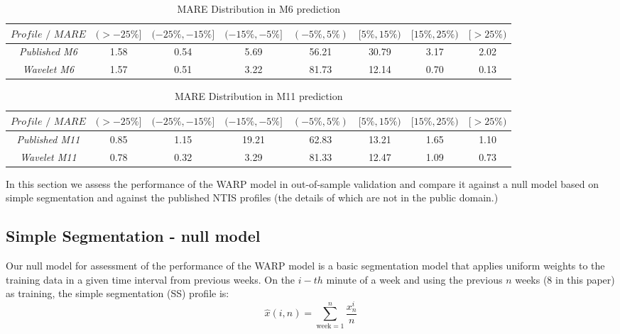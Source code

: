 \documentclass[a4paper, 10pt, conference]{ieeeconf}      %
\begin{document}
\begin{table}[bp]
	\caption{MARE Distribution in M6 prediction}
	\centering
	\begin{center}
	\begin{tabular}{SSSSSSSS} \toprule
    {$\textit{Profile / MARE}$} & {$(>-25\%]$} & {$(-25\%,-15\%] $} & {$(-15\%,-5\%]$} & {$(-5\%,5\%)$} & {$[5\%,15\%)$} & {$[15\%,25\%)$} & {$[>25\%)$} \\ \midrule
    \textit{Published M6}  & 1.58 & 0.54 & 5.69 & 56.21 & 30.79 & 3.17 & 2.02 \\
    \textit{Wavelet M6}  & 1.57  & 0.51 & 3.22  & 81.73 & 12.14 & 0.70  & 0.13 \\ \bottomrule
\end{tabular}
	\end{center}
\end{table}
\begin{table}[bp]
	\caption{MARE Distribution in M11 prediction}
	\centering
	\begin{center}
	\begin{tabular}{SSSSSSSS} \toprule
    {$\textit{Profile / MARE}$} & {$(>-25\%]$} & {$(-25\%,-15\%] $} & {$(-15\%,-5\%]$} & {$(-5\%,5\%)$} & {$[5\%,15\%)$} & {$[15\%,25\%)$} & {$[>25\%)$} \\ \midrule
    \textit{Published M11}  & 0.85 & 1.15 & 19.21 & 62.83 & 13.21 & 1.65 & 1.10 \\
    \textit{Wavelet M11}  & 0.78  & 0.32 & 3.29  & 81.33 & 12.47 & 1.09  & 0.73 \\ \bottomrule
\end{tabular}
	\end{center}
\end{table}


In this section we assess the performance of the WARP model in out-of-sample validation and compare it against a null model based on simple segmentation and against the published NTIS profiles (the details of which are not in the public domain.)

\subsection{Simple Segmentation - null model}
Our null model for assessment of the performance of the WARP model is a basic segmentation model that applies uniform weights to the training data in a given time interval from previous weeks. 
On the $i-th$ minute of a week and using the previous $n$ weeks (8 in this paper) as training, the simple segmentation (SS) profile is:
\begin{equation}
\hat{x}(i,n) = \sum_{\textrm{week}=1}^{n} \frac{x^i_n}{n} 
\end{equation}
\end{document}
